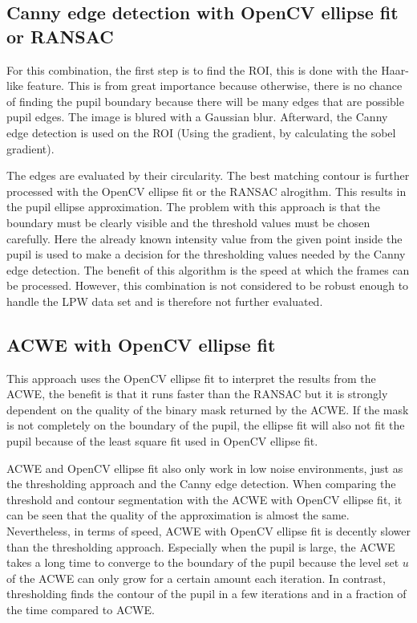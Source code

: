 \subsection{Canny edge detection with OpenCV ellipse fit or RANSAC}
For this combination, the first step is to find the ROI, this is done with the Haar-like feature. This is from great importance because otherwise, there is no chance of finding the pupil boundary because there will be many edges that are possible pupil edges. The image is blured with a Gaussian blur. Afterward, the Canny edge detection is used on the ROI (Using the gradient, by calculating the sobel gradient). 

The edges are evaluated by their circularity. The best matching contour is further processed with the OpenCV ellipse fit or the RANSAC alrogithm. This results in the pupil ellipse approximation. The problem with this approach is that the boundary must be clearly visible and the threshold values must be chosen carefully. Here the already known intensity value from the given point inside the pupil is used to make a decision for the thresholding values needed by the Canny edge detection. The benefit of this algorithm is the speed at which the frames can be processed. However, this combination is not considered to be robust enough to handle the LPW data set and is therefore not further evaluated.

\subsection{ACWE with OpenCV ellipse fit}
This approach uses the OpenCV ellipse fit to interpret the results from the ACWE, the benefit is that it runs faster than the RANSAC but it is strongly dependent on the quality of the binary mask returned by the ACWE. If the mask is not completely on the boundary of the pupil, the ellipse fit will also not fit the pupil because of the least square fit used in OpenCV ellipse fit. 

ACWE and OpenCV ellipse fit also only work in low noise environments, just as the thresholding approach and the Canny edge detection. When comparing the threshold and contour segmentation with the ACWE with OpenCV ellipse fit, it can be seen that the quality of the approximation is almost the same. Nevertheless, in terms of speed, ACWE with OpenCV ellipse fit is decently slower than the thresholding approach. Especially when the pupil is large, the ACWE takes a long time to converge to the boundary of the pupil because the level set $u$ of the ACWE can only grow for a certain amount each iteration. In contrast, thresholding finds the contour of the pupil in a few iterations and in a fraction of the time compared to ACWE.


